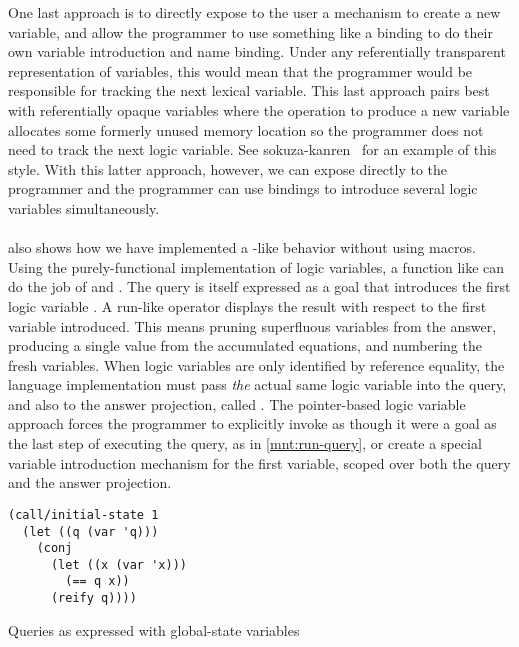 \documentclass[sigplan,balance,pbalance,natbib=false]{acmart}
\begin{document}
One last approach is to directly expose to the user a mechanism to
create a new variable, and allow the programmer to use something like
a  binding to do their own variable introduction and
name binding. Under any referentially transparent representation of
variables, this would mean that the programmer would be responsible
for tracking the next lexical variable. This last approach pairs best
with referentially opaque variables where the operation to produce a
new variable allocates some formerly unused memory location so the
programmer does not need to track the next logic variable. See
sokuza-kanren~\cite{kiselyov2006taste} for an example of this style.
With this latter approach, however, we can expose 
directly to the programmer and the programmer can use 
bindings to introduce several logic variables simultaneously.

\paragraph{}

 also shows how we have
implemented a -like behavior without using macros.
Using the purely-functional implementation of logic variables, a
function like  can do the job
of  and . The query is itself
expressed as a goal that introduces the first logic
variable . A run-like operator displays the result with
respect to the first variable introduced. This means pruning
superfluous variables from the answer, producing a single value from
the accumulated equations, and numbering the fresh variables. When
logic variables are only identified by reference equality, the
language implementation must pass \emph{the} actual same logic
variable into the query, and also to the answer projection,
called . The pointer-based logic variable approach
forces the programmer to explicitly invoke  as
though it were a goal as the last step of executing the query, as in
\cref{mnt:run-query}, or create a special variable introduction
mechanism for the first variable, scoped over both the query and the
answer projection.

\begin{listing}
  \begin{verbatim}
(call/initial-state 1
  (let ((q (var 'q)))
    (conj
      (let ((x (var 'x)))
        (== q x))
      (reify q))))
  \end{verbatim}
  \caption{Queries as expressed with global-state variables}\label{mnt:run-query}
\end{listing}
\end{document}
